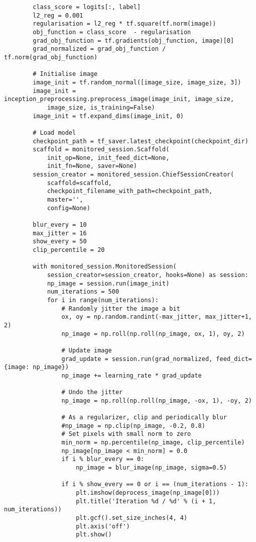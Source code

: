 \begin{lstlisting}
        class_score = logits[:, label]
        l2_reg = 0.001
        regularisation = l2_reg * tf.square(tf.norm(image))
        obj_function = class_score  - regularisation
        grad_obj_function = tf.gradients(obj_function, image)[0]
        grad_normalized = grad_obj_function / tf.norm(grad_obj_function)

        # Initialise image
        image_init = tf.random_normal([image_size, image_size, 3])
        image_init = inception_preprocessing.preprocess_image(image_init, image_size, 
            image_size, is_training=False)
        image_init = tf.expand_dims(image_init, 0)

        # Load model
        checkpoint_path = tf_saver.latest_checkpoint(checkpoint_dir)
        scaffold = monitored_session.Scaffold(
            init_op=None, init_feed_dict=None,
            init_fn=None, saver=None)
        session_creator = monitored_session.ChiefSessionCreator(
            scaffold=scaffold,
            checkpoint_filename_with_path=checkpoint_path,
            master='',
            config=None)

        blur_every = 10
        max_jitter = 16
        show_every = 50
        clip_percentile = 20

        with monitored_session.MonitoredSession(
            session_creator=session_creator, hooks=None) as session:
            np_image = session.run(image_init)
            num_iterations = 500
            for i in range(num_iterations):
                # Randomly jitter the image a bit
                ox, oy = np.random.randint(-max_jitter, max_jitter+1, 2)
                np_image = np.roll(np.roll(np_image, ox, 1), oy, 2)

                # Update image
                grad_update = session.run(grad_normalized, feed_dict={image: np_image})
                np_image += learning_rate * grad_update

                # Undo the jitter
                np_image = np.roll(np.roll(np_image, -ox, 1), -oy, 2)

                # As a regularizer, clip and periodically blur
                #np_image = np.clip(np_image, -0.2, 0.8)
                # Set pixels with small norm to zero
                min_norm = np.percentile(np_image, clip_percentile)
                np_image[np_image < min_norm] = 0.0
                if i % blur_every == 0:
                    np_image = blur_image(np_image, sigma=0.5)

                if i % show_every == 0 or i == (num_iterations - 1):
                    plt.imshow(deprocess_image(np_image[0]))
                    plt.title('Iteration %d / %d' % (i + 1, num_iterations))
                    plt.gcf().set_size_inches(4, 4)
                    plt.axis('off')
                    plt.show()

\end{lstlisting}



